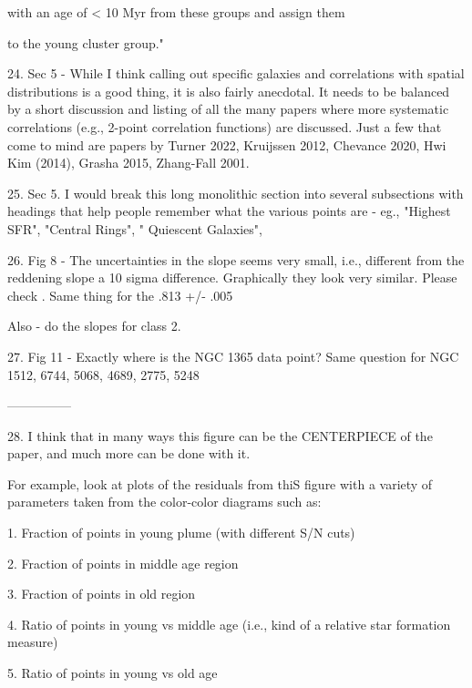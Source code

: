 with an age of < 10 Myr from these groups and assign them

to the young cluster group."

 

24. Sec 5 - While  I think calling out specific galaxies and correlations with spatial distributions is a good thing, it is also fairly anecdotal. It needs to be balanced by a short discussion and listing of all the many papers where more systematic correlations (e.g., 2-point correlation functions)  are discussed. Just a few that come to mind are papers by Turner 2022, Kruijssen 2012, Chevance 2020, Hwi Kim (2014), Grasha 2015,  Zhang-Fall 2001.

 

25. Sec 5. I would break this long monolithic section into several subsections with headings that help people remember what the various points are - eg., "Highest SFR", "Central Rings", " Quiescent Galaxies", 

 

26. Fig 8  - The uncertainties in the slope seems very small, i.e., different from the reddening slope a 10 sigma difference. Graphically they look very similar. Please check . Same thing for the .813 +/- .005

 

Also - do the slopes for class 2.

 

27. Fig 11 - Exactly where is the NGC 1365 data point? Same question for NGC 1512, 6744, 5068, 4689, 2775, 5248

 

 

---------------

28. I think that in many ways this figure can be the CENTERPIECE of the paper, and much more can be done with it.

 

For example, look at plots of the residuals from thiS figure with a variety of parameters taken from the  color-color diagrams such as:

 

1. Fraction of points in young plume (with different S/N cuts)

2. Fraction of points in middle age region

3. Fraction of points in old region

4. Ratio of points in young vs middle age (i.e., kind of a relative star formation measure)

5. Ratio of points in young vs old age


